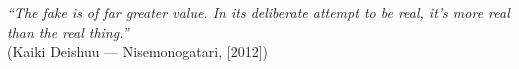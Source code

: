\begin{epigrafe}
    \vspace*{\fill}
{%
    \noindent\hspace{.5\textwidth}
    {\begin{minipage}{.5\textwidth}
        \textit{``The fake is of far greater value. In its deliberate attempt to be real, it’s more real than the real thing.''}\\(Kaiki Deishuu {---} Nisemonogatari, [2012])
    \end{minipage}}%
    \vspace*{3cm}
}%
\end{epigrafe}
